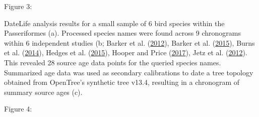 Figure 3:

DateLife analysis results for a small sample of 6 bird species within the Passeriformes (a). Processed species names were found across 9 chronograms within 6 independent studies (b; Barker et al. (\protect\hyperlink{ref-barker2012going}{2012}), Barker et al. (\protect\hyperlink{ref-barker2015new}{2015}), Burns et al. (\protect\hyperlink{ref-burns2014phylogenetics}{2014}), Hedges et al. (\protect\hyperlink{ref-Hedges2015}{2015}), Hooper and Price (\protect\hyperlink{ref-hooper2017chromosomal}{2017}), Jetz et al. (\protect\hyperlink{ref-Jetz2012}{2012}). This revealed 28 source age data points for the queried species names. Summarized age data was used as secondary calibrations to date a tree topology obtained from OpenTree's synthetic tree v13.4, resulting in a chronogram of summary source ages (c).


Figure 4:

